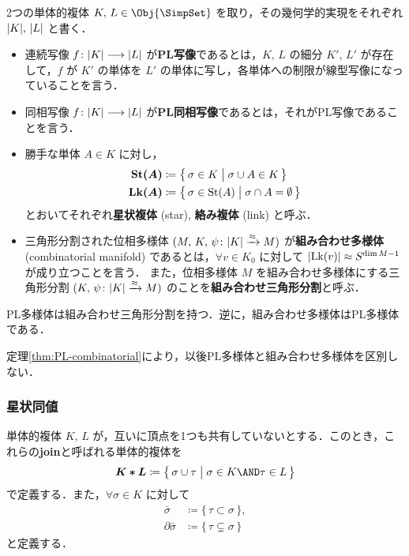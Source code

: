 \documentclass[TQFT_main]{subfiles}
\begin{document}
2つの単体的複体 $K,\, L \in \Obj{\SimpSet}$ を取り，その幾何学的実現をそれぞれ $\abs{K},\, \abs{L}$ と書く．
\begin{itemize}
    \item 連続写像 $f \colon \abs{K} \longrightarrow \abs{L}$ が\textbf{PL写像}であるとは，$K,\, L$ の細分 $K',\, L'$ が存在して，$f$ が $K'$ の単体を $L'$ の単体に写し，各単体への制限が線型写像になっていることを言う．
    \item 同相写像 $f \colon \abs{K} \longrightarrow \abs{L}$ が\textbf{PL同相写像}であるとは，それがPL写像であることを言う．
    \item 勝手な単体 $A \in K$ に対し，
    \begin{align}
        \bm{\mathrm{St}(A)} &\coloneqq \bigl\{\, \sigma \in K \bigm| \sigma \cup A \in K \,\bigr\} \\
        \bm{\mathrm{Lk}(A)} &\coloneqq \bigl\{\, \sigma \in \mathrm{St}(A) \bigm| \sigma \cap A = \emptyset \,\bigr\} 
    \end{align}
    とおいてそれぞれ\textbf{星状複体} (star), \textbf{絡み複体} (link) と呼ぶ．
    \item 三角形分割された位相多様体 $(M,\, K,\, \psi \colon \abs{K} \xrightarrow{\approx} M)$ が\textbf{組み合わせ多様体} (combinatorial manifold) であるとは，$\forall v \in K_0$ に対して $\abs{\mathrm{Lk}(v)} \approx S^{\dim M - 1}$ が成り立つことを言う．
    また，位相多様体 $M$ を組み合わせ多様体にする三角形分割 $(K,\, \psi \colon \abs{K} \xrightarrow{\approx} M)$ のことを\textbf{組み合わせ三角形分割}と呼ぶ．
\end{itemize}

\begin{mytheo}[label=thm:PL-combinatorial]{}
    PL多様体は組み合わせ三角形分割を持つ．逆に，組み合わせ多様体はPL多様体である．
\end{mytheo}

定理\ref{thm:PL-combinatorial}により，以後PL多様体と組み合わせ多様体を区別しない．

\subsubsection{星状同値}

単体的複体 $K,\, L$ が，互いに頂点を1つも共有していないとする．このとき，これらの\textbf{join}と呼ばれる単体的複体を
\begin{align}
    \bm{K * L} \coloneqq \bigl\{\, \sigma \cup \tau \bigm| \sigma \in K \AND \tau \in L \,\bigr\} 
\end{align}
で定義する．また，$\forall \sigma \in K$ に対して
\begin{align}
    \bar{\sigma} &\coloneqq \bigl\{\, \tau \subset \sigma  \,\bigr\} , \\
    \partial\bar{\sigma} &\coloneqq \bigl\{\, \tau \subsetneq \sigma  \,\bigr\}
\end{align}
と定義する．
\end{document}
